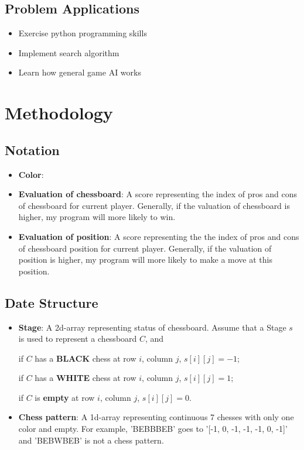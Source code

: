 \documentclass[lang=en,12pt]{elegantpaper}
\begin{document}
\subsection{Problem Applications}
\begin{itemize}
  \item Exercise python programming skills
  \item Implement search algorithm
  \item Learn how general game AI works
\end{itemize}

\section{Methodology}
\subsection{Notation}
\begin{itemize}
  \item {\bf Color}:
  \item {\bf Evaluation of chessboard}: A score representing the index of pros and cons of chessboard for current player.
  Generally, if the valuation of chessboard is higher, my program will more likely to win.
  \item {\bf Evaluation of position}: A score representing the the index of pros and cons of chessboard position for current player.
  Generally, if the valuation of position is higher, my program will more likely to make a move at this position.
\end{itemize}

\subsection{Date Structure}

\begin{itemize}
\item {\bf Stage}: A 2d-array representing status of chessboard.
Assume that a Stage $s$ is used to represent a chessboard $C$, and

if $C$ has a {\bf BLACK} chess at row $i$, column $j$, $s[i][j] = -1$;

if $C$ has a {\bf WHITE} chess at row $i$, column $j$, $s[i][j] = 1$;

if $C$ is {\bf empty} at row $i$, column $j$, $s[i][j] = 0$.

\item {\bf Chess pattern}: A 1d-array representing continuous 7 chesses with only one color and empty. For example, 'BEBBBEB' goes to '[-1, 0, -1, -1, -1, 0, -1]' and 'BEBWBEB' is not a chess pattern.
\end{itemize}
\end{document}
